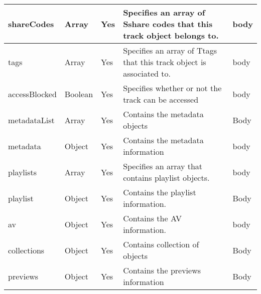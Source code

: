 \begin{longtable}{|>{\raggedright}p{}|>{\raggedright}p{}|>{\raggedright}p{}|>{\raggedright}p{}|>{\raggedright}p{}|}
\hline 
{\footnotesize{shareCodes}} & {\footnotesize{Array}} & {\footnotesize{Yes}} & {\footnotesize{Specifies an array of Sshare codes that this track
object belongs to.}} & {\footnotesize{body}}\tabularnewline
\hline 
{\footnotesize{tags}} & {\footnotesize{Array}} & {\footnotesize{Yes}} & {\footnotesize{Specifies an array of Ttags that this track object
is associated to.}} & {\footnotesize{body}}\tabularnewline
\hline 
{\footnotesize{accessBlocked}} & {\footnotesize{Boolean}} & {\footnotesize{Yes}} & {\footnotesize{Specifies whether or not the track can be accessed}} & {\footnotesize{body}}\tabularnewline
\hline 
{\footnotesize{metadataList}} & {\footnotesize{Array}} & {\footnotesize{Yes}} & {\footnotesize{Contains the metadata objects}} & {\footnotesize{Body}}\tabularnewline
\hline 
{\footnotesize{metadata}} & {\footnotesize{Object}} & {\footnotesize{Yes}} & {\footnotesize{Contains the metadata information}} & {\footnotesize{body}}\tabularnewline
\hline 
{\footnotesize{playlists}} & {\footnotesize{Array}} & {\footnotesize{Yes}} & {\footnotesize{Specifies an array that contains playlist objects.}} & {\footnotesize{body}}\tabularnewline
\hline 
{\footnotesize{playlist}} & {\footnotesize{Object}} & {\footnotesize{Yes}} & {\footnotesize{Contains the playlist information.}} & {\footnotesize{Body}}\tabularnewline
\hline 
{\footnotesize{av}} & {\footnotesize{Object}} & {\footnotesize{Yes}} & {\footnotesize{Contains the AV information.}} & {\footnotesize{body}}\tabularnewline
\hline 
{\footnotesize{collections}} & {\footnotesize{Object}} & {\footnotesize{Yes}} & {\footnotesize{Contains collection of objects}} & {\footnotesize{Body}}\tabularnewline
\hline 
{\footnotesize{previews}} & {\footnotesize{Object}} & {\footnotesize{Yes}} & {\footnotesize{Contains the previews information}} & {\footnotesize{Body}}\tabularnewline
\hline 
\end{longtable}{\footnotesize \par}







{\footnotesize{}}
